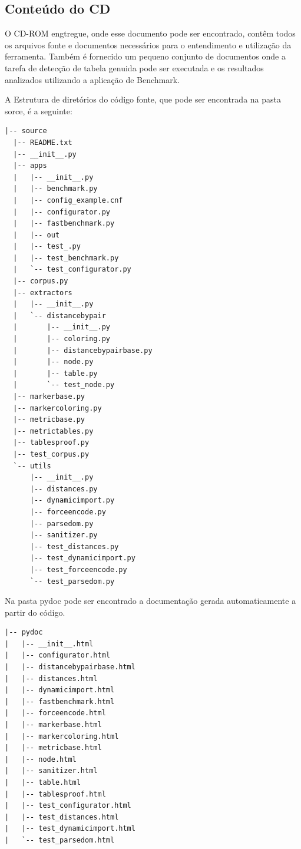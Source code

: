 \documentclass[12pt, a4paper]{article}
\newcommand{\remove}[1]{}
\begin{document}
\remove{
A documentação do código foi realizada utilizando outro modelo padrão de
Python, o pydoc, e pode ser encontrada na pasta raiz do projeto em
formato HTML para facilitar a leitura e a busca por alguma
funcionalidade específica.
}

\subsection{Conteúdo do CD}

O CD-ROM engtregue, onde esse documento pode ser encontrado, contêm
todos os arquivos fonte e documentos necessários para o entendimento e
utilização da ferramenta. Também é fornecido um pequeno conjunto de
documentos onde a tarefa de detecção de tabela genuida pode ser
executada e os resultados analizados utilizando a aplicação de Benchmark.

A Estrutura de diretórios do código fonte, que pode ser encontrada na
pasta sorce, é a seguinte:

\begin{verbatim}
|-- source
  |-- README.txt 
  |-- __init__.py
  |-- apps
  |   |-- __init__.py
  |   |-- benchmark.py
  |   |-- config_example.cnf
  |   |-- configurator.py
  |   |-- fastbenchmark.py
  |   |-- out
  |   |-- test_.py
  |   |-- test_benchmark.py
  |   `-- test_configurator.py
  |-- corpus.py
  |-- extractors
  |   |-- __init__.py
  |   `-- distancebypair
  |       |-- __init__.py
  |       |-- coloring.py
  |       |-- distancebypairbase.py
  |       |-- node.py
  |       |-- table.py
  |       `-- test_node.py
  |-- markerbase.py
  |-- markercoloring.py
  |-- metricbase.py
  |-- metrictables.py
  |-- tablesproof.py
  |-- test_corpus.py
  `-- utils
      |-- __init__.py
      |-- distances.py
      |-- dynamicimport.py
      |-- forceencode.py
      |-- parsedom.py
      |-- sanitizer.py
      |-- test_distances.py
      |-- test_dynamicimport.py
      |-- test_forceencode.py
      `-- test_parsedom.py
\end{verbatim}

Na pasta pydoc pode ser encontrado a documentação gerada automaticamente
a partir do código.

\begin{verbatim}
|-- pydoc
|   |-- __init__.html
|   |-- configurator.html
|   |-- distancebypairbase.html
|   |-- distances.html
|   |-- dynamicimport.html
|   |-- fastbenchmark.html
|   |-- forceencode.html
|   |-- markerbase.html
|   |-- markercoloring.html
|   |-- metricbase.html
|   |-- node.html
|   |-- sanitizer.html
|   |-- table.html
|   |-- tablesproof.html
|   |-- test_configurator.html
|   |-- test_distances.html
|   |-- test_dynamicimport.html
|   `-- test_parsedom.html
\end{verbatim}
\end{document}
